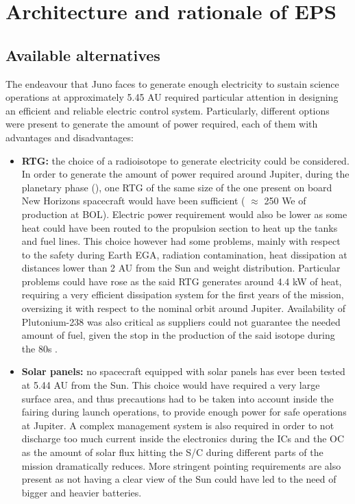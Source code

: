 \section{Architecture and rationale of EPS}
\label{sec:EPS_architecture_rationale}

\subsection{Available alternatives}
\label{subsec:available_alternatives}

The endeavour that Juno faces to generate enough electricity to sustain science operations at approximately 5.45 AU required particular attention in designing an efficient and reliable electric control system. Particularly, different options were present to generate the amount of power required, each of them with advantages and disadvantages:

\begin{itemize}
    \item \textbf{RTG:} the choice of a radioisotope to generate electricity could be considered. In order to generate the amount of power required around Jupiter, during the planetary phase 
    (\mref), 
    one RTG of the same size of the one present on board New Horizons spacecraft  would have been sufficient ( $\approx$ 250 We of production at BOL)\cite{nh_rtg}. Electric power requirement would also be lower as some heat could have been routed to the propulsion section to heat up the tanks and fuel lines. This choice however had some problems, mainly with respect to the safety during Earth EGA, radiation contamination, heat dissipation at distances lower than 2 AU from the Sun and weight distribution. Particular problems could have rose as the said RTG generates around 4.4 kW of heat, requiring a very efficient dissipation system for the first years of the mission, oversizing it with respect to the nominal orbit around Jupiter. Availability of Plutonium-238 was also critical as suppliers could not guarantee the needed amount of fuel, given the stop in the production of the said isotope during the 80s \cite{plutonium}. 
    
    \item \textbf{Solar panels:} no spacecraft equipped with solar panels has ever been tested at 5.44 AU from the Sun. This choice would have required a very large surface area, and thus precautions had to be taken into account inside the fairing during launch operations, to provide enough power for safe operations at Jupiter. A complex management system is also required in order to not discharge too much current inside the electronics during the ICs and the OC as the amount of solar flux hitting the S/C during different parts of the mission dramatically reduces. More stringent pointing requirements are also present as not having a clear view of the Sun could have led to the need of bigger and heavier batteries. 
\end{itemize}

